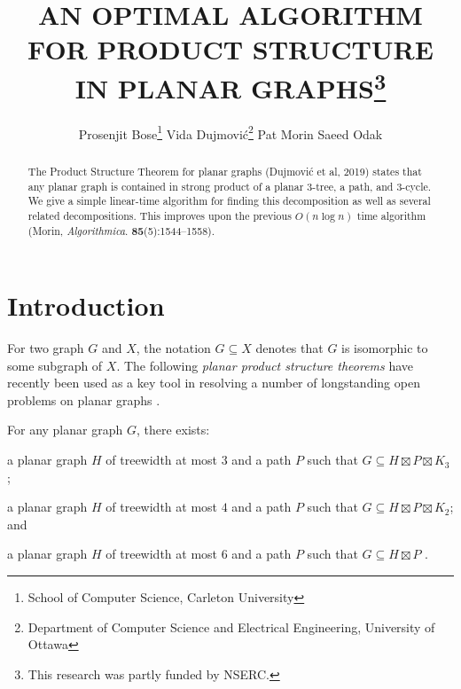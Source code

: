 \documentclass{patmorin}
\title{\MakeUppercase{An Optimal Algorithm for Product Structure in Planar Graphs}\thanks{This research was partly funded by NSERC.}}
\author{%
  Prosenjit Bose\thanks{School of Computer Science, Carleton University}\qquad
  Vida Dujmović\thanks{Department of Computer Science and Electrical Engineering, University of Ottawa}\qquad
  Pat Morin\footnotemark[1]\qquad
  Saeed Odak\footnotemark[2]}
\date{}
\begin{document}
\maketitle

\begin{abstract}
  The Product Structure Theorem for planar graphs (Dujmović et al, 2019) states that any planar graph is contained in strong product of a planar $3$-tree, a path, and $3$-cycle.  We give a simple linear-time algorithm for finding this decomposition as well as several related decompositions.  This improves upon the previous $O(n\log n)$ time algorithm (Morin, \emph{Algorithmica}. \textbf{85}(5):1544--1558).
\end{abstract}

%

\section{Introduction}

For two graph $G$ and $X$, the notation $G\subseteq X$ denotes that $G$ is isomorphic to some subgraph of $X$.
The following \emph{planar product structure theorems} have recently been used as a key tool in resolving a number of longstanding open problems on planar graphs \cite{dujmovic.esperet.ea:adjacency,dujmovic.joret.ea:planar,dujmovic.esperet.ea:planar,debski.felsner.ea:improved}.

\begin{thm}\label{meta}
  For any planar graph $G$, there exists:
  \begin{compactenum}[(a)]
    \item \label{three_tree} a planar graph $H$ of treewidth at most $3$ and a path $P$ such that $G\subseteq H\boxtimes P\boxtimes K_3$ \cite{dujmovic.joret.ea:planar};
    \item a planar graph $H$ of treewidth at most $4$ and a path $P$ such that $G\subseteq H\boxtimes P\boxtimes K_2$; and
    \item a planar graph $H$ of treewidth at most $6$ and a path $P$ such that $G\subseteq H\boxtimes P$ \cite{ueckerdt.wood.ea:improved}.
  \end{compactenum}
\end{thm}
\end{document}
